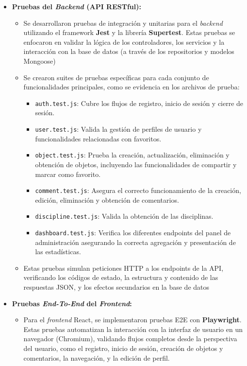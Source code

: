 \begin{itemize}
    \item \textbf{Pruebas del \textit{Backend} (API RESTful):}
    \begin{itemize}
        \item Se desarrollaron pruebas de integración y unitarias para el \textit{backend} utilizando el framework \textbf{Jest} y la librería \textbf{Supertest}. Estas pruebas se enfocaron en validar la lógica de los controladores, los servicios y la interacción con la base de datos (a través de los repositorios y modelos Mongoose)
        \item Se crearon suites de pruebas específicas para cada conjunto de funcionalidades principales, como se evidencia en los archivos de prueba:
        \begin{itemize}
            \item \texttt{auth.test.js}: Cubre los flujos de registro, inicio de sesión y cierre de sesión.
            \item \texttt{user.test.js}: Valida la gestión de perfiles de usuario y funcionalidades relacionadas con favoritos.
            \item \texttt{object.test.js}: Prueba la creación, actualización, eliminación y obtención de objetos, incluyendo las funcionalidades de compartir y marcar como favorito.
            \item \texttt{comment.test.js}: Asegura el correcto funcionamiento de la creación, edición, eliminación y obtención de comentarios.
            \item \texttt{discipline.test.js}: Valida la obtención de las disciplinas.
            \item \texttt{dashboard.test.js}: Verifica los diferentes endpoints del panel de administración asegurando la correcta agregación y presentación de las estadísticas.
        \end{itemize}
        \item Estas pruebas simulan peticiones HTTP a los endpoints de la API, verificando los códigos de estado, la estructura y contenido de las respuestas JSON, y los efectos secundarios en la base de datos
    \end{itemize}
    \vspace{0.3cm}
    \item \textbf{Pruebas \textit{End-To-End} del \textit{Frontend}:}
    \begin{itemize}
        \item Para el \textit{frontend} React, se implementaron pruebas E2E con \textbf{Playwright}. Estas pruebas automatizan la interacción con la interfaz de usuario en un navegador (Chromium), validando flujos completos desde la perspectiva del usuario, como el registro, inicio de sesión, creación de objetos y comentarios, la navegación, y la edición de perfil.

\end{itemize}
\end{itemize}
